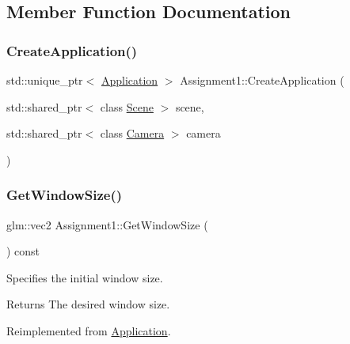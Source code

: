 \subsection{Member Function Documentation}
\hypertarget{class_assignment1_ae1952b4904620a16c4f2c098bf061c68}{}\label{class_assignment1_ae1952b4904620a16c4f2c098bf061c68} 
\subsubsection{\texorpdfstring{Create\+Application()}{CreateApplication()}}
{\footnotesize\ttfamily std\+::unique\+\_\+ptr$<$ \hyperlink{class_application}{Application} $>$ Assignment1\+::\+Create\+Application (\begin{DoxyParamCaption}\item[{std\+::shared\+\_\+ptr$<$ class \hyperlink{class_scene}{Scene} $>$}]{scene,  }\item[{std\+::shared\+\_\+ptr$<$ class \hyperlink{class_camera}{Camera} $>$}]{camera }\end{DoxyParamCaption})\hspace{0.3cm}{\ttfamily [static]}}

\hypertarget{class_assignment1_a581b6c897c918eede3f9bbb1cbc50320}{}\label{class_assignment1_a581b6c897c918eede3f9bbb1cbc50320} 
\subsubsection{\texorpdfstring{Get\+Window\+Size()}{GetWindowSize()}}
{\footnotesize\ttfamily glm\+::vec2 Assignment1\+::\+Get\+Window\+Size (\begin{DoxyParamCaption}{ }\end{DoxyParamCaption}) const\hspace{0.3cm}{\ttfamily [virtual]}}



Specifies the initial window size. 

\begin{DoxyReturn}{Returns}
The desired window size. 
\end{DoxyReturn}


Reimplemented from \hyperlink{class_application_ab190ae0e987fe95682714dd4b2495e82}{Application}.


